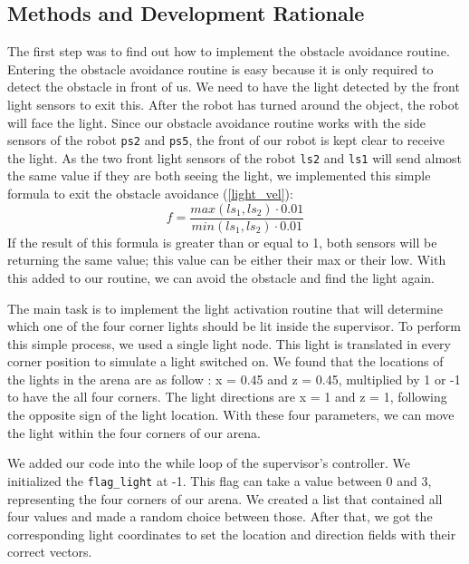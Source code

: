 \documentclass[lettersize,journal]{IEEEtran}
\begin{document}
\subsection{Methods and Development Rationale}
The first step was to find out how to implement the obstacle avoidance routine. Entering the obstacle avoidance routine is easy because it is only required to detect the obstacle in front of us. We need to have the light detected by the front light sensors to exit this. After the robot has turned around the object, the robot will face the light. Since our obstacle avoidance routine works with the side sensors of the robot \texttt{ps2} and \texttt{ps5}, the front of our robot is kept clear to receive the light. As the two front light sensors of the robot \texttt{ls2} and \texttt{ls1} will send almost the same value if they are both seeing the light, we implemented this simple formula to exit the obstacle avoidance (\ref{light_vel}):
\begin{equation}
\label{light_vel}
f = \frac{max(ls_1,ls_2)\cdot 0.01}{min(ls_1,ls_2)\cdot 0.01}
\end{equation}
If the result of this formula is greater than or equal to 1, both sensors will be returning the same value; this value can be either their max or their low. With this added to our routine, we can avoid the obstacle and find the light again.
\par
The main task is to implement the light activation routine that will determine which one of the four corner lights should be lit inside the supervisor. To perform this simple process, we used a single light node. This light is translated in every corner position to simulate a light switched on. We found that the locations of the lights in the arena are as follow : x = 0.45 and z = 0.45, multiplied by 1 or -1 to have the all four corners. The light directions are x = 1 and z = 1, following the opposite sign of the light location. With these four parameters, we can move the light within the four corners of our arena.
\par
We added our code into the while loop of the supervisor’s controller. We initialized the \texttt{flag\_light} at -1. This flag can take a value between 0 and 3, representing the four corners of our arena. We created a list that contained all four values and made a random choice between those. After that, we got the corresponding light coordinates to set the location and direction fields with their correct vectors.
\end{document}
